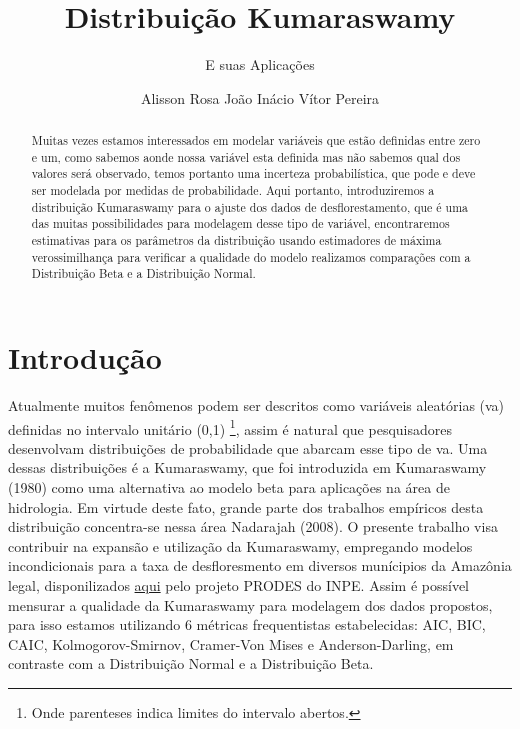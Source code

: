 \documentclass[
]{article}
\title{Distribuição Kumaraswamy}
\subtitle{E suas Aplicações}
\author{Alisson Rosa João Inácio Vítor Pereira}
\date{}
\begin{document}
\maketitle
\begin{abstract}
Muitas vezes estamos interessados em modelar variáveis que estão
definidas entre zero e um, como sabemos aonde nossa variável esta
definida mas não sabemos qual dos valores será observado, temos portanto
uma incerteza probabilística, que pode e deve ser modelada por medidas
de probabilidade. Aqui portanto, introduziremos a distribuição
Kumaraswamy para o ajuste dos dados de desflorestamento, que é uma das
muitas possibilidades para modelagem desse tipo de variável,
encontraremos estimativas para os parâmetros da distribuição usando
estimadores de máxima verossimilhança para verificar a qualidade do
modelo realizamos comparações com a Distribuição Beta e a Distribuição
Normal.
\end{abstract}
\ifdefined\Shaded\renewenvironment{Shaded}{\begin{tcolorbox}[interior hidden, frame hidden, boxrule=0pt, sharp corners, breakable, borderline west={3pt}{0pt}{shadecolor}, enhanced]}{\end{tcolorbox}}\fi

\section{\centering Introdução}

Atualmente muitos fenômenos podem ser descritos como variáveis
aleatórias (va) definidas no intervalo unitário (0,1) \footnote{Onde
  parenteses indica limites do intervalo abertos.}, assim é natural que
pesquisadores desenvolvam distribuições de probabilidade que abarcam
esse tipo de va. Uma dessas distribuições é a Kumaraswamy, que foi
introduzida em Kumaraswamy (1980) como uma alternativa ao modelo beta
para aplicações na área de hidrologia. Em virtude deste fato, grande
parte dos trabalhos empíricos desta distribuição concentra-se nessa área
Nadarajah (2008). O presente trabalho visa contribuir na expansão e
utilização da Kumaraswamy, empregando modelos incondicionais para a taxa
de desfloresmento em diversos munícipios da Amazônia legal,
disponilizados
\href{http://www.dpi.inpe.br/prodesdigital/prodesmunicipal.php}{aqui}
pelo projeto PRODES do INPE. Assim é possível mensurar a qualidade da
Kumaraswamy para modelagem dos dados propostos, para isso estamos
utilizando 6 métricas frequentistas estabelecidas: AIC, BIC, CAIC,
Kolmogorov-Smirnov, Cramer-Von Mises e Anderson-Darling, em contraste
com a Distribuição Normal e a Distribuição Beta.
\end{document}
